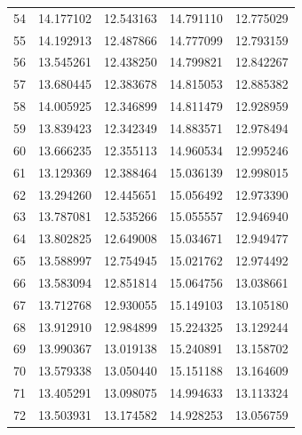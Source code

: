 \begin{table}
\begin{tabular}{rrrrr}
54 & 14.177102 & 12.543163 & 14.791110 & 12.775029 \\
55 & 14.192913 & 12.487866 & 14.777099 & 12.793159 \\
56 & 13.545261 & 12.438250 & 14.799821 & 12.842267 \\
57 & 13.680445 & 12.383678 & 14.815053 & 12.885382 \\
58 & 14.005925 & 12.346899 & 14.811479 & 12.928959 \\
59 & 13.839423 & 12.342349 & 14.883571 & 12.978494 \\
60 & 13.666235 & 12.355113 & 14.960534 & 12.995246 \\
61 & 13.129369 & 12.388464 & 15.036139 & 12.998015 \\
62 & 13.294260 & 12.445651 & 15.056492 & 12.973390 \\
63 & 13.787081 & 12.535266 & 15.055557 & 12.946940 \\
64 & 13.802825 & 12.649008 & 15.034671 & 12.949477 \\
65 & 13.588997 & 12.754945 & 15.021762 & 12.974492 \\
66 & 13.583094 & 12.851814 & 15.064756 & 13.038661 \\
67 & 13.712768 & 12.930055 & 15.149103 & 13.105180 \\
68 & 13.912910 & 12.984899 & 15.224325 & 13.129244 \\
69 & 13.990367 & 13.019138 & 15.240891 & 13.158702 \\
70 & 13.579338 & 13.050440 & 15.151188 & 13.164609 \\
71 & 13.405291 & 13.098075 & 14.994633 & 13.113324 \\
72 & 13.503931 & 13.174582 & 14.928253 & 13.056759 \\
\bottomrule
\end{tabular}
\end{table}
